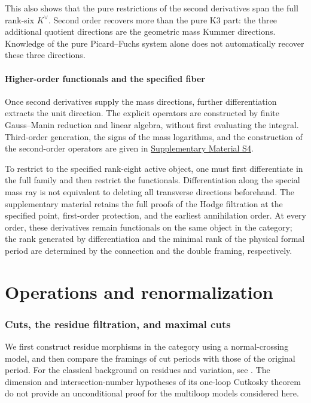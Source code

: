 \documentclass[11pt,a4paper,oneside]{article}
\theoremstyle{plain}
\theoremstyle{definition}
\theoremstyle{remark}
\numberwithin{equation}{section}
\newcommand{\otherref}[2]{\href{#1.pdf}{#2}}
\begin{document}
This also shows that the pure restrictions of the second derivatives span the full rank-six $K^\vee$.
Second order recovers more than the pure K3 part: the three additional quotient directions are the geometric mass Kummer directions.
Knowledge of the pure Picard--Fuchs system alone does not automatically recover these three directions.


\endgroup
\subsection{Higher-order functionals and the specified fiber}
Once second derivatives supply the mass directions, further differentiation extracts the unit direction. The explicit operators are constructed by finite Gauss--Manin reduction and linear algebra, without first evaluating the integral. Third-order generation, the signs of the mass logarithms, and the construction of the second-order operators are given in \otherref{feynman_periods_supplement_en}{Supplementary Material S4}.

To restrict to the specified rank-eight active object, one must first differentiate in the full family and then restrict the functionals. Differentiation along the special mass ray is not equivalent to deleting all transverse directions beforehand. The supplementary material retains the full proofs of the Hodge filtration at the specified point, first-order protection, and the earliest annihilation order. At every order, these derivatives remain functionals on the same object in the category; the rank generated by differentiation and the minimal rank of the physical formal period are determined by the connection and the double framing, respectively.

\part{Operations and renormalization}



\section{Cuts, the residue filtration, and maximal cuts}\label{ch:cut}

\begingroup

We first construct residue morphisms in the category using a normal-crossing model, and then compare the framings of cut periods with those of the original period. For the classical background on residues and variation, see \cite{muhlbauer}. The dimension and intersection-number hypotheses of its one-loop Cutkosky theorem do not provide an unconditional proof for the multiloop models considered here.
\end{document}
